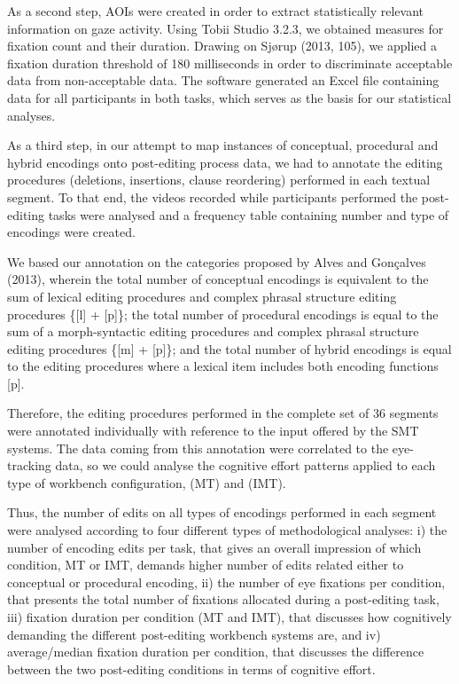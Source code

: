 \documentclass[output=paper]{langsci/langscibook}
\begin{document}
As a second step, AOIs were created in order to extract statistically relevant information on gaze activity. Using Tobii Studio 3.2.3, we obtained measures for fixation count and their duration. Drawing on Sjørup (2013, 105), we applied a fixation duration threshold of 180 milliseconds in order to discriminate acceptable data from non-acceptable data. The software generated an Excel file containing data for all participants in both tasks, which serves as the basis for our statistical analyses.



As a third step, in our attempt to map instances of conceptual, procedural and hybrid encodings onto post-editing process data, we had to annotate the editing procedures (deletions, insertions, clause reordering) performed in each textual segment. To that end, the videos recorded while participants performed the post-editing tasks were analysed and a frequency table containing number and type of encodings were created. 



We based our annotation on the categories proposed by Alves and Gonçalves (2013), wherein the total number of conceptual encodings is equivalent to the sum of lexical editing procedures and complex phrasal structure editing procedures \{[l] + [p]\}; the total number of procedural encodings is equal to the sum of a morph-syntactic editing procedures and complex phrasal structure editing procedures \{[m] + [p]\}; and the total number of hybrid encodings is equal to the editing procedures where a lexical item includes both encoding functions [p]. 



Therefore, the editing procedures performed in the complete set of 36 segments were annotated individually with reference to the input offered by the SMT systems.  The data coming from this annotation were correlated to the eye-tracking data, so we could analyse the cognitive effort patterns applied to each type of workbench configuration, (MT) and (IMT). 



Thus, the number of edits on all types of encodings performed in each segment were analysed according to four different types of methodological analyses: i) the number of encoding edits per task, that gives an overall impression of which condition, MT or IMT, demands higher number of  edits related either to conceptual or procedural encoding, ii) the number of eye fixations per condition, that presents the total number of fixations allocated during a post-editing task, iii) fixation duration per condition (MT and IMT), that discusses how cognitively demanding the different post-editing workbench systems are, and iv) average/median fixation duration per condition, that discusses the difference between the two post-editing conditions in terms of cognitive effort.   
\end{document}
